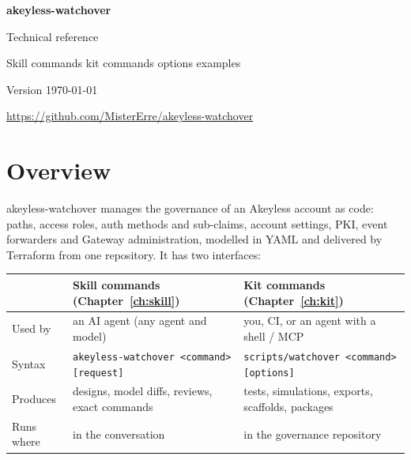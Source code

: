 \documentclass[10pt,a4paper,openany]{report}
\begin{document}
\begin{titlepage}
  \sffamily\color{wo-accent}
  \vspace*{5cm}
  {\fontsize{32}{38}\selectfont\bfseries akeyless-watchover\par}
  \vspace{0.4cm}
  {\LARGE Technical reference\par}
  \vspace{0.3cm}
  {\large\color{black}Skill commands \textperiodcentered{} kit commands \textperiodcentered{} options \textperiodcentered{} examples\par}
  \vfill
  {\color{black}Version \woversion\hfill\today\par}
  {\small\color{gray}\url{https://github.com/MisterErre/akeyless-watchover}\par}
\end{titlepage}
\tableofcontents
\clearpage
{}

\chapter{Overview}\label{ch:overview}
akeyless-watchover manages the governance of an Akeyless account as code: paths, access roles,
auth methods and sub-claims, account settings, PKI, event forwarders and Gateway administration,
modelled in YAML and delivered by Terraform from one repository. It has two interfaces:

\begin{center}\small
\begin{tabularx}{\linewidth}{@{}l>{\raggedright\arraybackslash}X>{\raggedright\arraybackslash}X@{}}
\toprule
& \textbf{Skill commands} (Chapter~\ref{ch:skill}) & \textbf{Kit commands} (Chapter~\ref{ch:kit}) \\ \midrule
Used by & an AI agent (any agent and model) & you, CI, or an agent with a shell / MCP \\
Syntax & \texttt{akeyless-watchover <command> [request]} & \texttt{scripts/watchover <command> [options]} \\
Produces & designs, model diffs, reviews, exact commands & tests, simulations, exports, scaffolds, packages \\
Runs where & in the conversation & in the governance repository \\
\bottomrule
\end{tabularx}
\end{center}
\end{document}
